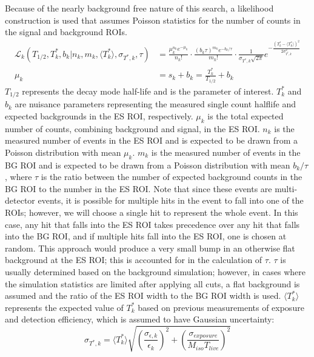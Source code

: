 \documentclass[notitlepage,rmp,aps,10pt]{revtex4-1}
\begin{document}
Because of the nearly background free nature of this search, a likelihood construction is used that assumes Poisson statistics for the number of counts in the signal and background ROIs.
\begin{equation}
  \label{eq:rolke}
  \begin{aligned}
    \mathcal{L}_k(T_{1/2},T^*_k,b_k|n_k,m_k,\langle T^*_k\rangle, \sigma_{T^*,k},\tau)
    &=\frac{\mu_k^{n_k}e^{-\mu_k}}{n_k!} \cdot \frac{(b_k\tau)^{m_k}e^{-b_k/\tau}}{m_k!} \cdot
    \frac{1}{\sigma_{T^*,k}\sqrt{2\pi}}e^{-\frac{(T^*_k-\langle T^*_k\rangle)^2}{2\sigma_{T^*,k}^2}} \\
    \mu_k &= s_k+b_k = \frac{T^*_k}{T_{1/2}} + b_k
  \end{aligned}
\end{equation}
$T_{1/2}$ represents the decay mode half-life and is the parameter of interest.
$T^*_k$ and $b_k$ are nuisance parameters representing the measured single count halflife and expected backgrounds in the ES ROI, respectively.
$\mu_k$ is the total expected number of counts, combining background and signal, in the ES ROI.
$n_k$ is the measured number of events in the ES ROI and is expected to be drawn from a Poisson distribution with mean $\mu_k$.
$m_k$ is the measured number of events in the BG ROI and is expected to be drawn from a Poisson distribution with mean $b_k/\tau$, where $\tau$ is the ratio between the number of expected background counts in the BG ROI to the number in the ES ROI.
Note that since these events are multi-detector events, it is possible for multiple hits in the event to fall into one of the ROIs; however, we will choose a single hit to represent the whole event.
In this case, any hit that falls into the ES ROI takes precedence over any hit that falls into the BG ROI, and if multiple hits fall into the ES ROI, one is chosen at random.
This approach would produce a very small bump in an otherwise flat background at the ES ROI; this is accounted for in the calculation of $\tau$.
$\tau$ is usually determined based on the background simulation; however, in cases where the simulation statistics are limited after applying all cuts, a flat background is assumed and the ratio of the ES ROI width to the BG ROI width is used.
$\langle T^*_k\rangle$ represents the expected value of $T^*_k$ based on previous measurements of exposure and detection efficiency, which is assumed to have Gaussian uncertainty:
\begin{equation}
  \sigma_{T^*,k} = \langle T^*_k\rangle\sqrt{(\frac{\sigma_{\epsilon,k}}{\epsilon_k })^2 + (\frac{\sigma_{exposure}}{M_{iso}T_{live} })^2}
\end{equation}
\end{document}
